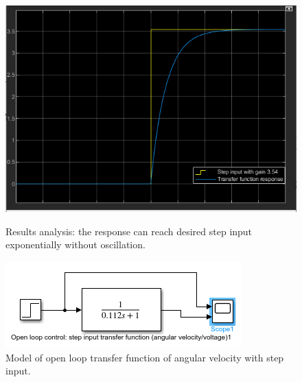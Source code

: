\documentclass[conference]{IEEEtran}
\begin{document}
\begin{figure}[htbp]
    \centering
    \begin{minipage}[b]{0.24\textwidth}
        \includegraphics[width=\textwidth]{./Graph/G2.png}
        \caption{Results analysis: the response can reach desired step input exponentially without oscillation.}
    \end{minipage}
    \hfill
    \begin{minipage}[b]{0.24\textwidth}
        \centering
        \includegraphics[width=\textwidth]{./Graph/G2'.png}
        \caption{Model of open loop transfer function of angular velocity with step input.}
    \end{minipage}
\end{figure}
\end{document}
